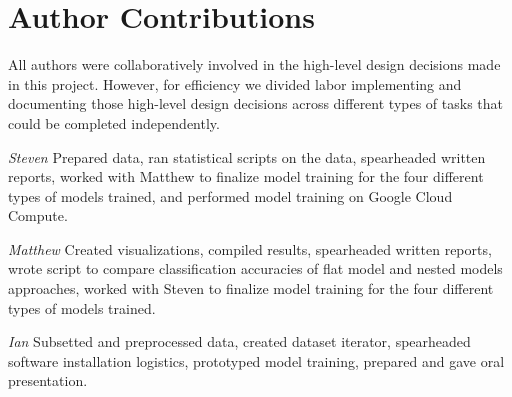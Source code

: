 \section{Author Contributions}

All authors were collaboratively involved in the high-level design decisions made in this project.
However, for efficiency we divided labor implementing and documenting those high-level design decisions across different types of tasks that could be completed independently.


\noindent
\textit{Steven} Prepared data, ran statistical scripts on the data, spearheaded written reports, worked with Matthew to finalize model training for the four different types of models trained, and performed model training on Google Cloud Compute.

\noindent
\textit{Matthew} Created visualizations, compiled results, spearheaded written reports, wrote script to compare classification accuracies of flat model and nested models approaches, worked with Steven to finalize model training for the four different types of models trained.

\noindent
\textit{Ian} Subsetted and preprocessed data, created dataset iterator, spearheaded software installation logistics, prototyped model training, prepared and gave oral presentation. 

